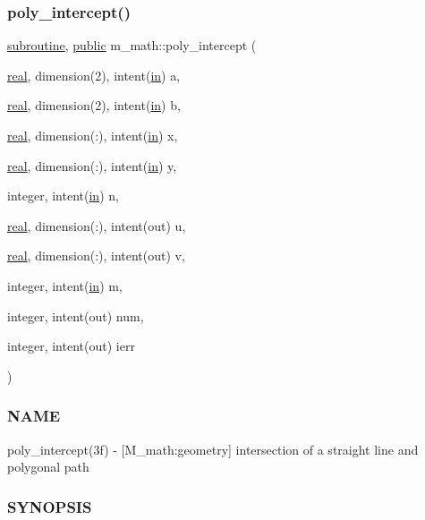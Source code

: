 \subsubsection{\texorpdfstring{poly\+\_\+intercept()}{poly\_intercept()}}
{\footnotesize\ttfamily \hyperlink{M__stopwatch_83_8txt_acfbcff50169d691ff02d4a123ed70482}{subroutine}, \hyperlink{M__stopwatch_83_8txt_a2f74811300c361e53b430611a7d1769f}{public} m\+\_\+math\+::poly\+\_\+intercept (\begin{DoxyParamCaption}\item[{\hyperlink{read__watch_83_8txt_abdb62bde002f38ef75f810d3a905a823}{real}, dimension(2), intent(\hyperlink{M__journal_83_8txt_afce72651d1eed785a2132bee863b2f38}{in})}]{a,  }\item[{\hyperlink{read__watch_83_8txt_abdb62bde002f38ef75f810d3a905a823}{real}, dimension(2), intent(\hyperlink{M__journal_83_8txt_afce72651d1eed785a2132bee863b2f38}{in})}]{b,  }\item[{\hyperlink{read__watch_83_8txt_abdb62bde002f38ef75f810d3a905a823}{real}, dimension(\+:), intent(\hyperlink{M__journal_83_8txt_afce72651d1eed785a2132bee863b2f38}{in})}]{x,  }\item[{\hyperlink{read__watch_83_8txt_abdb62bde002f38ef75f810d3a905a823}{real}, dimension(\+:), intent(\hyperlink{M__journal_83_8txt_afce72651d1eed785a2132bee863b2f38}{in})}]{y,  }\item[{integer, intent(\hyperlink{M__journal_83_8txt_afce72651d1eed785a2132bee863b2f38}{in})}]{n,  }\item[{\hyperlink{read__watch_83_8txt_abdb62bde002f38ef75f810d3a905a823}{real}, dimension(\+:), intent(out)}]{u,  }\item[{\hyperlink{read__watch_83_8txt_abdb62bde002f38ef75f810d3a905a823}{real}, dimension(\+:), intent(out)}]{v,  }\item[{integer, intent(\hyperlink{M__journal_83_8txt_afce72651d1eed785a2132bee863b2f38}{in})}]{m,  }\item[{integer, intent(out)}]{num,  }\item[{integer, intent(out)}]{ierr }\end{DoxyParamCaption})}



\subsubsection*{N\+A\+ME}

poly\+\_\+intercept(3f) -\/ \mbox{[}M\+\_\+math\+:geometry\mbox{]} intersection of a straight line and polygonal path \subsubsection*{S\+Y\+N\+O\+P\+S\+IS}

